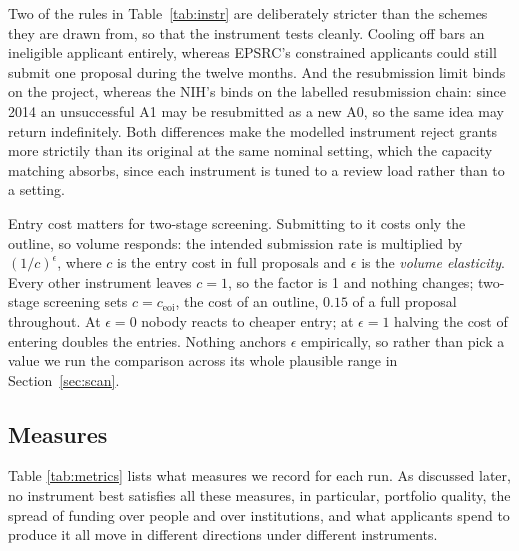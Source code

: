 \documentclass[11pt,a4paper]{article}
\begin{document}
Two of the rules in Table~\ref{tab:instr} are deliberately stricter than the
schemes they are drawn from, so that the instrument tests cleanly. Cooling off bars an ineligible
applicant entirely, whereas EPSRC's constrained applicants could still submit one
proposal during the twelve months. And the resubmission limit binds on the
project, whereas the NIH's binds on the labelled resubmission chain: since 2014 an
unsuccessful A1 may be resubmitted as a new A0, so the same idea may return
indefinitely. Both differences make the modelled instrument reject grants more strictily than its
original at the same nominal setting, which the capacity matching absorbs, since
each instrument is tuned to a review load rather than to a setting.

Entry cost matters for two-stage screening. Submitting to it costs only the
outline, so volume responds: the intended submission rate is multiplied by
$(1/c)^{\epsilon}$, where $c$ is the entry cost in full proposals and $\epsilon$ is
the \emph{volume elasticity}. Every other instrument leaves $c=1$, so the factor
is 1 and nothing changes; two-stage screening sets $c = c_{\text{eoi}}$, the cost
of an outline, $0.15$ of a full proposal throughout. At $\epsilon=0$ nobody reacts to cheaper entry; at
$\epsilon=1$ halving the cost of entering doubles the entries. Nothing anchors
$\epsilon$ empirically, so rather than pick a value we run the comparison across
its whole plausible range in Section~\ref{sec:scan}.

\subsection{Measures}

Table \ref{tab:metrics} lists what measures we record for each run. As discussed later, no instrument best satisfies all these measures, in particular, 
portfolio quality, the spread of funding over people and over
institutions, and what applicants spend to produce it all move in different
directions under different instruments.
\end{document}
